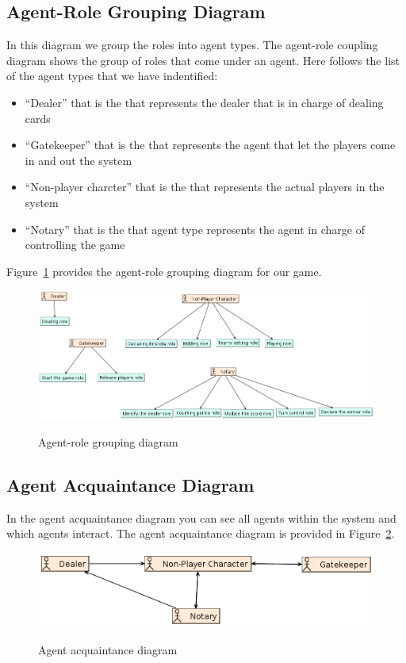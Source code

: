 \documentclass[a4paper]{article}
\begin{document}
\subsection{Agent-Role Grouping Diagram}

In this diagram we group the roles into agent types. The agent-role coupling diagram shows the group of roles that come under an agent. Here follows the list of the agent types that we have indentified:
\begin{itemize}
  \item ``Dealer'' that is the that represents the dealer that is in charge of dealing cards
  \item ``Gatekeeper'' that is the that represents the agent that let the players come in and out the system
  \item ``Non-player charcter'' that is the that represents the actual players in the system
  \item ``Notary'' that is the that agent type represents the agent in charge of controlling the game
\end{itemize}

Figure~\ref{fig:agentrole} provides the agent-role grouping diagram for our game.

\begin{figure}[htp]
  \centering
  \includegraphics[keepaspectratio,scale=0.45]{pdt/images/architectural_design/aget-role_grouping.png}
  \label{fig:agentrole}
  \caption{Agent-role grouping diagram}
\end{figure}

\subsection{Agent Acquaintance Diagram}

In the agent acquaintance diagram you can see all agents within the system and which agents interact. The agent acquaintance diagram is provided in Figure~\ref{fig:agentacq}. 

\begin{figure}[htp]
  \centering
  \includegraphics[keepaspectratio,scale=0.45]{pdt/images/architectural_design/agent_acquaintance.png}
  \label{fig:agentacq}
  \caption{Agent acquaintance diagram}
\end{figure}
\end{document}
